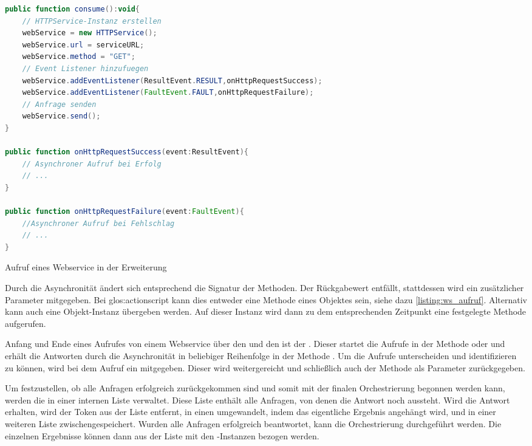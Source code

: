 \begin{onehalfspacing}
\begin{programm}[htbp]
\begin{lstlisting}[language=ActionScript]
public function consume():void{
	// HTTPService-Instanz erstellen
	webService = new HTTPService();
	webService.url = serviceURL;       
	webService.method = "GET";
	// Event Listener hinzufuegen
	webService.addEventListener(ResultEvent.RESULT,onHttpRequestSuccess);
	webService.addEventListener(FaultEvent.FAULT,onHttpRequestFailure);
	// Anfrage senden
	webService.send();
}
		
public function onHttpRequestSuccess(event:ResultEvent){
	// Asynchroner Aufruf bei Erfolg
	// ...
}
		
public function onHttpRequestFailure(event:FaultEvent){
	//Asynchroner Aufruf bei Fehlschlag
	// ...
}
\end{lstlisting}
\caption{Aufruf eines Webservice in der Erweiterung\label{listing:ws_aufruf}}
\end{programm}

Durch die Asynchronität ändert sich entsprechend die Signatur der Methoden. Der Rückgabewert entfällt, stattdessen wird ein zusätzlicher Parameter mitgegeben. Bei \gls{glos:actionscript} kann dies entweder eine Methode eines Objektes sein, siehe dazu \vref{listing:ws_aufruf}. Alternativ kann auch eine Objekt-Instanz übergeben werden. Auf dieser Instanz wird dann zu dem entsprechenden Zeitpunkt eine festgelegte Methode aufgerufen.

Anfang und Ende eines Aufrufes von einem Webservice über den  und den  ist der . Dieser startet die Aufrufe in der Methode  oder  und erhält die Antworten durch die Asynchronität in beliebiger Reihenfolge in der Methode . Um die Aufrufe unterscheiden und identifizieren zu können, wird bei dem Aufruf ein  mitgegeben. Dieser wird weitergereicht und schließlich auch der Methode  als Parameter zurückgegeben.

Um festzustellen, ob alle Anfragen erfolgreich zurückgekommen sind und somit mit der finalen Orchestrierung begonnen werden kann, werden die  in einer internen Liste verwaltet. Diese Liste enthält alle Anfragen, von denen die Antwort noch aussteht.  Wird die Antwort erhalten, wird der Token aus der Liste entfernt, in einen  umgewandelt, indem das eigentliche Ergebnis angehängt wird, und in einer weiteren Liste zwischengespeichert. Wurden alle Anfragen erfolgreich beantwortet, kann die Orchestrierung durchgeführt werden. Die einzelnen Ergebnisse können dann aus der Liste mit den -Instanzen bezogen werden.


\end{onehalfspacing}
